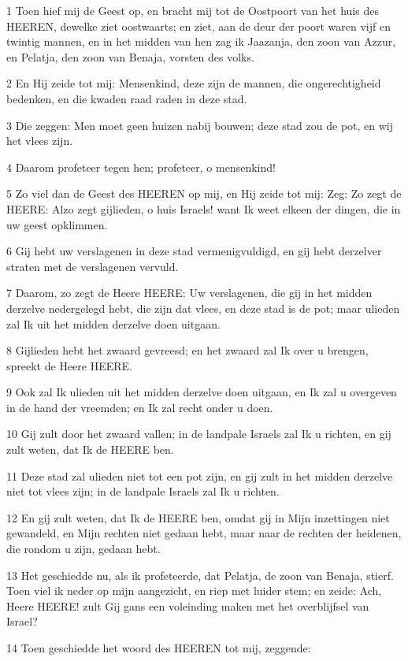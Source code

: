 \par 1 Toen hief mij de Geest op, en bracht mij tot de Oostpoort van het huis des HEEREN, dewelke ziet oostwaarts; en ziet, aan de deur der poort waren vijf en twintig mannen, en in het midden van hen zag ik Jaazanja, den zoon van Azzur, en Pelatja, den zoon van Benaja, vorsten des volks.
\par 2 En Hij zeide tot mij: Mensenkind, deze zijn de mannen, die ongerechtigheid bedenken, en die kwaden raad raden in deze stad.
\par 3 Die zeggen: Men moet geen huizen nabij bouwen; deze stad zou de pot, en wij het vlees zijn.
\par 4 Daarom profeteer tegen hen; profeteer, o mensenkind!
\par 5 Zo viel dan de Geest des HEEREN op mij, en Hij zeide tot mij: Zeg: Zo zegt de HEERE: Alzo zegt gijlieden, o huis Israels! want Ik weet elkeen der dingen, die in uw geest opklimmen.
\par 6 Gij hebt uw verslagenen in deze stad vermenigvuldigd, en gij hebt derzelver straten met de verslagenen vervuld.
\par 7 Daarom, zo zegt de Heere HEERE: Uw verslagenen, die gij in het midden derzelve nedergelegd hebt, die zijn dat vlees, en deze stad is de pot; maar ulieden zal Ik uit het midden derzelve doen uitgaan.
\par 8 Gijlieden hebt het zwaard gevreesd; en het zwaard zal Ik over u brengen, spreekt de Heere HEERE.
\par 9 Ook zal Ik ulieden uit het midden derzelve doen uitgaan, en Ik zal u overgeven in de hand der vreemden; en Ik zal recht onder u doen.
\par 10 Gij zult door het zwaard vallen; in de landpale Israels zal Ik u richten, en gij zult weten, dat Ik de HEERE ben.
\par 11 Deze stad zal ulieden niet tot een pot zijn, en gij zult in het midden derzelve niet tot vlees zijn; in de landpale Israels zal Ik u richten.
\par 12 En gij zult weten, dat Ik de HEERE ben, omdat gij in Mijn inzettingen niet gewandeld, en Mijn rechten niet gedaan hebt, maar naar de rechten der heidenen, die rondom u zijn, gedaan hebt.
\par 13 Het geschiedde nu, als ik profeteerde, dat Pelatja, de zoon van Benaja, stierf. Toen viel ik neder op mijn aangezicht, en riep met luider stem; en zeide: Ach, Heere HEERE! zult Gij gans een voleinding maken met het overblijfsel van Israel?
\par 14 Toen geschiedde het woord des HEEREN tot mij, zeggende:
